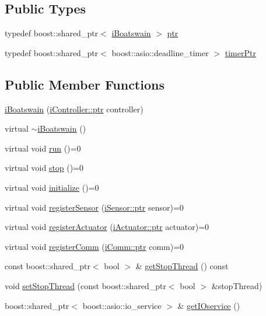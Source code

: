\subsection*{Public Types}
\begin{DoxyCompactItemize}
\item 
typedef boost\+::shared\+\_\+ptr$<$ \hyperlink{classo_cpt_1_1i_boatswain}{i\+Boatswain} $>$ \hyperlink{classo_cpt_1_1i_boatswain_ad5e2819c6252955a7eddba4a4c980e3c}{ptr}
\item 
typedef boost\+::shared\+\_\+ptr$<$ boost\+::asio\+::deadline\+\_\+timer $>$ \hyperlink{classo_cpt_1_1i_boatswain_ac42d91dd3964880be9475ccaab4231cd}{timer\+Ptr}
\end{DoxyCompactItemize}
\subsection*{Public Member Functions}
\begin{DoxyCompactItemize}
\item 
\hyperlink{classo_cpt_1_1i_boatswain_a9424746b673744868f521b7a34a1064a}{i\+Boatswain} (\hyperlink{classo_cpt_1_1i_controller_a6d89a95cd6ad68bb74adfaca2f36370f}{i\+Controller\+::ptr} controller)
\item 
virtual \hyperlink{classo_cpt_1_1i_boatswain_a0577a8228f2a93e07ef21e22e9c17bde}{$\sim$i\+Boatswain} ()
\item 
virtual void \hyperlink{classo_cpt_1_1i_boatswain_a4512e742ba996b32dcc452d9f180724a}{run} ()=0
\item 
virtual void \hyperlink{classo_cpt_1_1i_boatswain_ad1fb6362c814a72ea6c4dc9a9042cf5e}{stop} ()=0
\item 
virtual void \hyperlink{classo_cpt_1_1i_boatswain_a0749ff59de42e7a8a47586ab9d9ac98f}{initialize} ()=0
\item 
virtual void \hyperlink{classo_cpt_1_1i_boatswain_aa9f9014202617a705d7ce21db2877222}{register\+Sensor} (\hyperlink{classo_cpt_1_1i_sensor_a03533d2c5dc66e332d70dbb3b5e3006a}{i\+Sensor\+::ptr} sensor)=0
\item 
virtual void \hyperlink{classo_cpt_1_1i_boatswain_a7915584ee17a28b1fc506a8968e27387}{register\+Actuator} (\hyperlink{classo_cpt_1_1i_actuator_a35847799558e92bb84fb6c71de772cac}{i\+Actuator\+::ptr} actuator)=0
\item 
virtual void \hyperlink{classo_cpt_1_1i_boatswain_aebae826c7516c1688e94d84de5606cac}{register\+Comm} (\hyperlink{classo_cpt_1_1i_comm_af0c655f143251b7d03fcd98f89637228}{i\+Comm\+::ptr} comm)=0
\item 
const boost\+::shared\+\_\+ptr$<$ bool $>$ \& \hyperlink{classo_cpt_1_1i_boatswain_ad35f3f30f3430ce4c1790ca375565889}{get\+Stop\+Thread} () const
\item 
void \hyperlink{classo_cpt_1_1i_boatswain_ac4c9a286c90132944dfab6df31900fc3}{set\+Stop\+Thread} (const boost\+::shared\+\_\+ptr$<$ bool $>$ \&stop\+Thread)
\item 
boost\+::shared\+\_\+ptr$<$ boost\+::asio\+::io\+\_\+service $>$ \& \hyperlink{classo_cpt_1_1i_boatswain_aa064a9b107c71e71b25c5cbd4957e804}{get\+I\+Oservice} ()
\end{DoxyCompactItemize}
